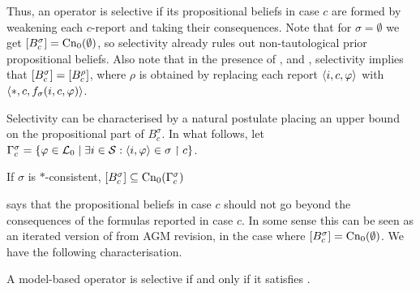 Thus, an operator is selective if its propositional beliefs in case $c$ are
formed by weakening each $c$-report and taking their consequences. Note that for
$\sigma = \emptyset$ we get $\left[{B^\sigma_c}\right] = \operatorname{Cn}_0(\emptyset)$, so
selectivity already rules out non-tautological prior propositional beliefs.
Also note that in the presence of \closure{}, \containment{} and \soundness{},
selectivity implies that $\left[{B^\sigma_c}\right] = \left[{B^\rho_c}\right]$, where
$\rho$ is obtained by replacing each report $\langle {i, c, \varphi} \rangle$ with
$\langle {\ast, c, f_\sigma(i, c, \varphi)} \rangle$.

Selectivity can be characterised by a natural postulate placing an upper bound
on the propositional part of $B^\sigma_c$. In what follows, let
$\Gamma^\sigma_c = \{\varphi \in \mathcal{L}{}_0 \mid \exists i \in \mathcal{S}: \langle {i, \varphi} \rangle
\in \sigma \upharpoonright c\}$.

\begin{postulate}[\boundedness{}]
    If $\sigma$ is $\ast$-consistent, $\left[{B^\sigma_c}\right]
    \subseteq \operatorname{Cn}_0(\Gamma^\sigma_c)$
\end{postulate}

\boundedness{} says that the propositional beliefs in case $c$ should not go
beyond the consequences of the formulas reported in case $c$. In some sense
this can be seen as an iterated version of  from AGM
revision, in the case where $\left[{B^\sigma_c}\right] = \operatorname{Cn}_0(\emptyset)$. We
have the following characterisation.

\begin{theorem}
    \label{thm:selectivity_characterisation}
    A model-based operator is selective if and only if it satisfies
    \boundedness{}.
\end{theorem}

